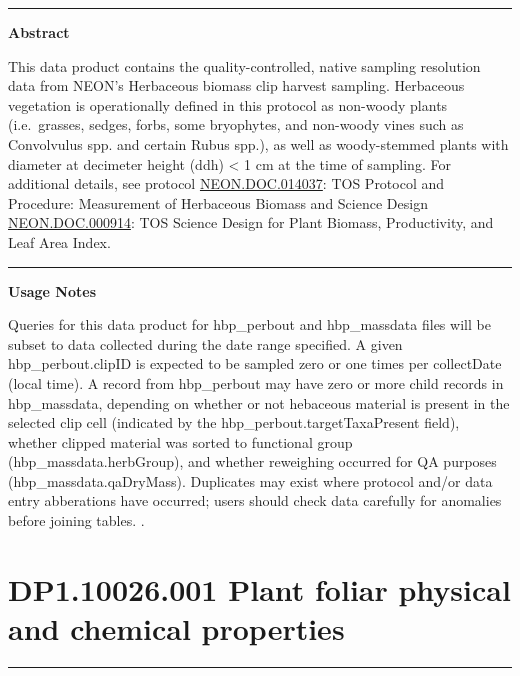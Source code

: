 \documentclass[]{article}
\begin{document}
\begin{center}\rule{0.5\linewidth}{\linethickness}\end{center}

\textbf{Abstract}

This data product contains the quality-controlled, native sampling
resolution data from NEON's Herbaceous biomass clip harvest sampling.
Herbaceous vegetation is operationally defined in this protocol as
non-woody plants (i.e.~grasses, sedges, forbs, some bryophytes, and
non-woody vines such as Convolvulus spp. and certain Rubus spp.), as
well as woody-stemmed plants with diameter at decimeter height (ddh)
\textless{} 1 cm at the time of sampling. For additional details, see
protocol
\href{http://data.neonscience.org/api/v0/documents/NEON.DOC.014037vG}{NEON.DOC.014037}:
TOS Protocol and Procedure: Measurement of Herbaceous Biomass and
Science Design
\href{http://data.neonscience.org/api/v0/documents/NEON.DOC.000914vA}{NEON.DOC.000914}:
TOS Science Design for Plant Biomass, Productivity, and Leaf Area Index.

\begin{center}\rule{0.5\linewidth}{\linethickness}\end{center}

\textbf{Usage Notes}

Queries for this data product for hbp\_perbout and hbp\_massdata files
will be subset to data collected during the date range specified. A
given hbp\_perbout.clipID is expected to be sampled zero or one times
per collectDate (local time). A record from hbp\_perbout may have zero
or more child records in hbp\_massdata, depending on whether or not
hebaceous material is present in the selected clip cell (indicated by
the hbp\_perbout.targetTaxaPresent field), whether clipped material was
sorted to functional group (hbp\_massdata.herbGroup), and whether
reweighing occurred for QA purposes (hbp\_massdata.qaDryMass).
Duplicates may exist where protocol and/or data entry abberations have
occurred; users should check data carefully for anomalies before joining
tables. \newpage
.

\section{DP1.10026.001 Plant foliar physical and chemical
properties}\label{dp1.10026.001-plant-foliar-physical-and-chemical-properties}

\begin{center}\rule{0.5\linewidth}{\linethickness}\end{center}
\end{document}
